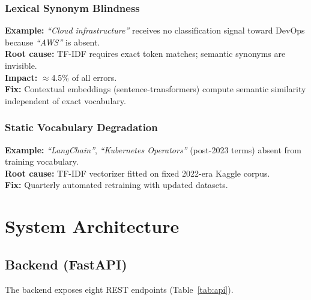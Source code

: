 \documentclass[10pt,twocolumn]{article}
\begin{document}
\subsubsection{Lexical Synonym Blindness}
\textbf{Example:} \textit{``Cloud infrastructure''} receives no classification signal toward DevOps because \textit{``AWS''} is absent.\\
\textbf{Root cause:} TF-IDF requires exact token matches; semantic synonyms are invisible.\\
\textbf{Impact:} $\approx$4.5\% of all errors.\\
\textbf{Fix:} Contextual embeddings (sentence-transformers) compute semantic similarity independent of exact vocabulary.

\subsubsection{Static Vocabulary Degradation}
\textbf{Example:} \textit{``LangChain''}, \textit{``Kubernetes Operators''} (post-2023 terms) absent from training vocabulary.\\
\textbf{Root cause:} TF-IDF vectorizer fitted on fixed 2022-era Kaggle corpus.\\
\textbf{Fix:} Quarterly automated retraining with updated datasets.

\section{System Architecture}

\subsection{Backend (FastAPI)}

The backend exposes eight REST endpoints (Table~\ref{tab:api}).
\end{document}
